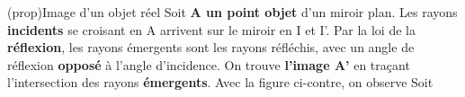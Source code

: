 \documentclass[../../main/main.tex]{subfiles}
\begin{document}
\begin{tcb*}[label=prop, sidebyside, righthand ratio=.4](prop){Image d'un objet réel}
	Soit \textbf{A un point objet} d'un miroir plan. Les rayons \textbf{incidents}
	se croisant en A arrivent sur le miroir en I et I'. Par la loi de la
	\textbf{réflexion}, les rayons émergents sont les rayons réfléchis, avec un
	angle de réflexion \textbf{opposé} à l'angle d'incidence. On trouve
	\textbf{l'image A'} en traçant l'intersection des rayons \textbf{émergents}.
	\bigbreak
	Avec la figure ci-contre, on observe
	\psw{%
		\[
			\tan(i) =
			\frac{\obar{\rm HI}}{\obar{\rm HA}} =
			\frac{\obar{\rm HI}}{-\obar{\rm HA'}}
		\]
	}%
	Soit
	\psw{%
		\[
			\boxed{\obar{\rm HA'} = -\obar{\rm HA}}
		\]
	}%
	\tcblower
	\begin{center}
		\label{fig:mir_plan-obj_r}
	\end{center}
\end{tcb*}
\end{document}
